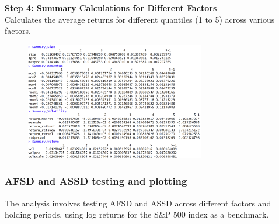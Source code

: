 \documentclass{article}
\begin{document}
\textbf{Step 4: Summary Calculations for Different Factors}\\
Calculates the average returns for different quantiles (1 to 5) across various factors.
\begin{figure}[H]
    \centering
    \includegraphics[width=0.7\textwidth]{14.png}
    \label{fig:example}
\end{figure}
\hypertarget{AFSD and ASSD testing and plotting}{%
\subsubsection{AFSD and ASSD testing and plotting}\label{AFSD and ASSD testing and plotting}}

The analysis involves testing AFSD and ASSD across different factors and holding periods, using log returns for the S\&P 500 index as a benchmark.
\end{document}
